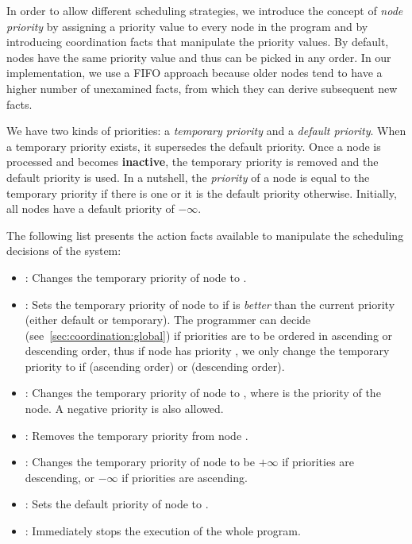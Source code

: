 
In order to allow different scheduling strategies, we introduce the concept of
\emph{node priority} by assigning a priority value to every node in the program
and by introducing coordination facts that manipulate the priority values.  By
default, nodes have the same priority value and thus can be picked in any order. In our
implementation, we use a FIFO approach because older nodes tend to have a higher
number of unexamined facts, from which they can derive subsequent new facts.

We have two kinds of priorities: a \emph{temporary priority} and a \emph{default
priority}. When a temporary priority exists, it supersedes the default priority.
Once a node is processed and becomes \textbf{inactive}, the temporary priority
is removed and the default priority is used. In a nutshell, the \emph{priority}
of a node is equal to the temporary priority if there is one or it is the
default priority otherwise.  Initially, all nodes have a default priority of
$-\infty$.

The following list presents the action facts available to manipulate the
scheduling decisions of the system:

\begin{itemize}

   \item {}: Changes the temporary priority
      of node  to .


   \item {}: Sets the temporary priority of
      node  to  if  is \emph{better} than the current
      priority (either default or temporary). The programmer can decide
      (see~\ref{sec:coordination:global}) if priorities are to be ordered in
      ascending or descending order, thus if node  has priority
      , we only change the temporary priority to  if  (ascending order) or  (descending order).

   \item {}: Changes the temporary priority
      of node  to , where  is the priority of the
      node. A negative priority is also allowed.

   \item {}: Removes the temporary priority from node
   .

   \item {}: Changes the temporary priority of node
    to be $+\infty$ if priorities are descending, or $-\infty$ if
   priorities are ascending.

   \item {}: Sets the default
      priority of node  to .

   \item {}: Immediately stops the execution of the whole program.

\end{itemize}

